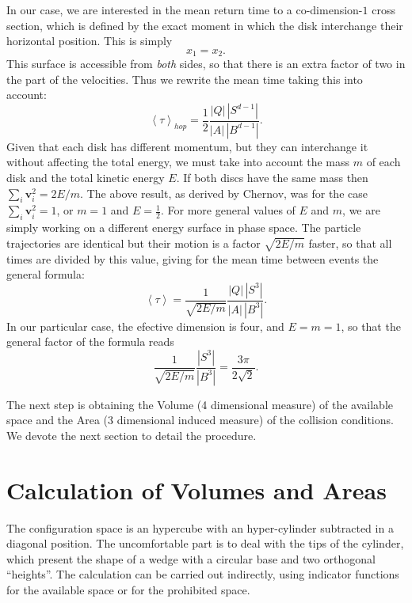 \documentclass[a4paper,10pt, jcp, aps, preprint]{revtex4-1}
\newcommand{\mean}[1]{\left \langle #1 \right \rangle}
\newcommand{\vv}{\mathbf{v}}
\begin{document}
In our case, we are interested in the mean return time to 
a co-dimension-$1$ cross section, 
which is defined by the exact moment
in which the disk interchange their horizontal position. This is simply
\begin{equation} \label{condchoque}
x_1 = x_2.
\end{equation}
This surface is accessible from \emph{both} sides, 
so that there is an extra factor of two in the part of the velocities. Thus 
we rewrite the mean time taking this into account: 
\begin{equation}
 \mean{\tau}_{hop} = \frac{1}{2} \frac{|Q| \, |S^{d-1}|} {|A| \, |B^{d-1}|}.	
\end{equation}
Given that each disk has different momentum, but
they can interchange it without affecting the
total energy, we must take into account the mass $m$ of each disk 
and the total kinetic energy $E$.
If both discs have the same mass then $\sum_i \vv_i^2 = 2E / m$.
The above result, as derived by Chernov, 
was for the case $\sum_i \vv_i^2 = 1$, or $m=1$ and $E=\frac{1}{2}$.  
For more general values of $E$ and $m$, 
we are simply working on a different energy surface in phase space. 
The particle trajectories are identical but their motion is a factor
$\sqrt{2E/m}$ faster, so that all times are divided by this value, 
giving for
the mean time between events the general formula:
\begin{equation} \label{meantimegeneral}
  \mean{\tau} =  \frac{1}{\sqrt{2E / m}} 
\frac{|Q| \, |S^3|} {|A| \, |B^3|}.	
\end{equation}
In our particular case, the efective dimension is four,
and $E=m=1$, so that the general factor of the formula reads
\begin{equation} \label{meantimegeneral}
   \frac{1}{\sqrt{2E / m}} 
\frac{|S^3|}{|B^3|}=\frac{3\pi}{2\sqrt{2}}.	 
\end{equation}

The next step is obtaining the Volume (4 dimensional measure) of
the available space and the Area (3 dimensional induced measure) of
the collision conditions. We devote the next section to
detail the procedure.


\section{Calculation of Volumes and Areas}

The configuration
space is an hypercube with an hyper-cylinder subtracted in a diagonal position.
The uncomfortable part is to deal with the tips of the cylinder, which
present the  shape of a wedge with a circular base and two 
orthogonal ``heights''. 
The calculation can be carried out indirectly, using indicator functions for the
available space or for the  prohibited space.
\end{document}
